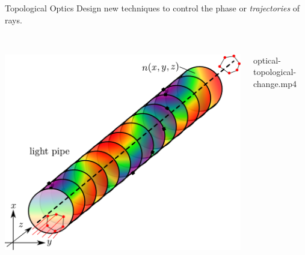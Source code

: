 \documentclass[fleqn,t,serif,10pt,aspectratio=141,compress]{beamer}
\begin{document}
\begin{frame}{Topological Optics}
    Design new techniques to control the phase or \textit{trajectories} of rays.

    \begin{columns}
        \begin{column}{.40\textwidth}
            ~\\
            \vspace{1cm}
            \includegraphics[width=\textwidth]{Light-Pipe-Concept.pdf}
        \end{column}
        \begin{column}{.65\textwidth}
            ~\\
                  {optical-topological-change.mp4}
        \end{column}
    \end{columns}
\end{frame}
\end{document}
